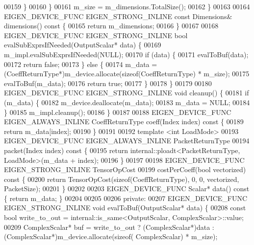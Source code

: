 \begin{DoxyCode}
00159       \}
00160     \}
00161     m\_size = m\_dimensions.TotalSize();
00162   \}
00163 
00164   EIGEN\_DEVICE\_FUNC EIGEN\_STRONG\_INLINE \textcolor{keyword}{const} Dimensions& dimensions()\textcolor{keyword}{ const }\{
00165     \textcolor{keywordflow}{return} m\_dimensions;
00166   \}
00167 
00168   EIGEN\_DEVICE\_FUNC EIGEN\_STRONG\_INLINE \textcolor{keywordtype}{bool} evalSubExprsIfNeeded(OutputScalar* data) \{
00169     m\_impl.evalSubExprsIfNeeded(NULL);
00170     \textcolor{keywordflow}{if} (data) \{
00171       evalToBuf(data);
00172       \textcolor{keywordflow}{return} \textcolor{keyword}{false};
00173     \} \textcolor{keywordflow}{else} \{
00174       m\_data = (CoeffReturnType*)m\_device.allocate(\textcolor{keyword}{sizeof}(CoeffReturnType) * m\_size);
00175       evalToBuf(m\_data);
00176       \textcolor{keywordflow}{return} \textcolor{keyword}{true};
00177     \}
00178   \}
00179 
00180   EIGEN\_DEVICE\_FUNC EIGEN\_STRONG\_INLINE \textcolor{keywordtype}{void} cleanup() \{
00181     \textcolor{keywordflow}{if} (m\_data) \{
00182       m\_device.deallocate(m\_data);
00183       m\_data = NULL;
00184     \}
00185     m\_impl.cleanup();
00186   \}
00187 
00188   EIGEN\_DEVICE\_FUNC EIGEN\_ALWAYS\_INLINE CoeffReturnType coeff(Index index)\textcolor{keyword}{ const }\{
00189     \textcolor{keywordflow}{return} m\_data[index];
00190   \}
00191 
00192   \textcolor{keyword}{template} <\textcolor{keywordtype}{int} LoadMode>
00193   EIGEN\_DEVICE\_FUNC EIGEN\_ALWAYS\_INLINE PacketReturnType
00194   packet(Index index)\textcolor{keyword}{ const }\{
00195     \textcolor{keywordflow}{return} internal::ploadt<PacketReturnType, LoadMode>(m\_data + index);
00196   \}
00197 
00198   EIGEN\_DEVICE\_FUNC EIGEN\_STRONG\_INLINE TensorOpCost
00199   costPerCoeff(\textcolor{keywordtype}{bool} vectorized)\textcolor{keyword}{ const }\{
00200     \textcolor{keywordflow}{return} TensorOpCost(\textcolor{keyword}{sizeof}(CoeffReturnType), 0, 0, vectorized, PacketSize);
00201   \}
00202 
00203   EIGEN\_DEVICE\_FUNC Scalar* data()\textcolor{keyword}{ const }\{ \textcolor{keywordflow}{return} m\_data; \}
00204 
00205 
00206  \textcolor{keyword}{private}:
00207   EIGEN\_DEVICE\_FUNC EIGEN\_STRONG\_INLINE \textcolor{keywordtype}{void} evalToBuf(OutputScalar* data) \{
00208     \textcolor{keyword}{const} \textcolor{keywordtype}{bool} write\_to\_out = internal::is\_same<OutputScalar, ComplexScalar>::value;
00209     ComplexScalar* buf = write\_to\_out ? (ComplexScalar*)data : (ComplexScalar*)m\_device.allocate(\textcolor{keyword}{sizeof}(
      ComplexScalar) * m\_size);

\end{DoxyCode}
